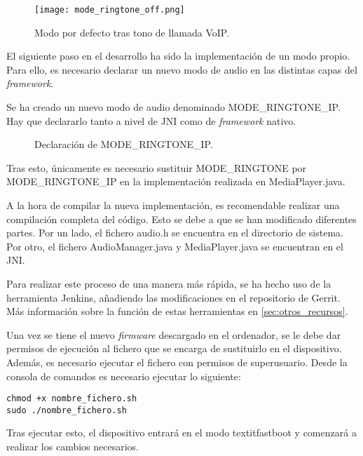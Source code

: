 \begin{figure}[H]
	\centering
	\texttt{[image: mode\_ringtone\_off.png]}
	\caption{Modo por defecto tras tono de llamada VoIP.}
	\label{fig:mode_ringtone_off}
\end{figure}

El siguiente paso en el desarrollo ha sido la implementación de un modo propio. Para ello, es necesario declarar un nuevo modo de audio en las distintas capas del \textit{framework}.

Se ha creado un nuevo modo de audio denominado MODE\_RINGTONE\_IP. Hay que declararlo tanto a nivel de \gls{JNI} como de \textit{framework} nativo.

\begin{figure}[H]
	\centering
	\caption{Declaración de MODE\_RINGTONE\_IP.} \label{fig:mode_ringtone_ip}
\end{figure}

Tras esto, únicamente es necesario sustituir MODE\_RINGTONE por MODE\_RINGTONE\_IP en la implementación realizada en MediaPlayer.java.

A la hora de compilar la nueva implementación, es recomendable realizar una compilación completa del código. Esto se debe a que se han modificado diferentes partes. Por un lado, el fichero audio.h se encuentra en el directorio de sistema. Por otro, el fichero AudioManager.java y MediaPlayer.java se encuentran en el \gls{JNI}.

Para realizar este proceso de una manera más rápida, se ha hecho uso de la herramienta Jenkins, añadiendo las modificaciones en el repositorio de Gerrit. Más información sobre la función de estas herramientas en \ref{sec:otros_recursos}.

Una vez se tiene el nuevo \textit{firmware} descargado en el ordenador, se le debe dar permisos de ejecución al fichero que se encarga de sustituirlo en el dispositivo. Además, es necesario ejecutar el fichero con permisos de superusuario. Desde la consola de comandos es necesario ejecutar lo siguiente:
\\
\lstset{breaklines=true, basicstyle=\footnotesize}
\begin{lstlisting}[frame=single]
chmod +x nombre_fichero.sh
sudo ./nombre_fichero.sh
\end{lstlisting}

Tras ejecutar esto, el dispositivo entrará en el modo textit{fastboot} y comenzará a realizar los cambios necesarios.
 
